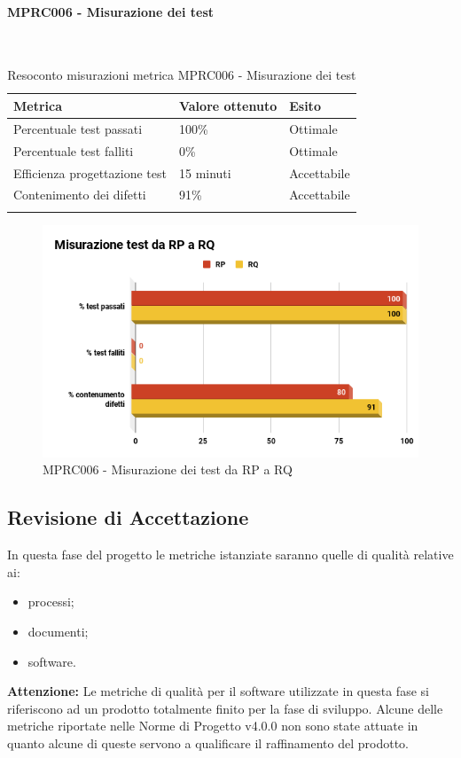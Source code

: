 \paragraph{MPRC006 - Misurazione dei test}\mbox{}\\[0.4cm]
\begin{center}
	\centering
	\renewcommand{\arraystretch}{1.5}
	\begin{longtable}{  p{5cm}  p{5cm} p{3cm}  }
		\rowcolor{tableHeadYellow}
		\textbf{Metrica}   & \textbf{Valore ottenuto} & \textbf{Esito} \\ 
		\endhead
		Percentuale test passati     & 100\%  & Ottimale \\
		Percentuale test falliti     & 0\% & Ottimale \\
		Efficienza progettazione test    & 15 minuti & Accettabile \\
		Contenimento dei difetti    & 91\% & Accettabile \\
		\rowcolor{white}
		\caption{Resoconto misurazioni metrica MPRC006 - Misurazione dei test}
	\end{longtable}
\end{center}
\begin{figure}[H]
	\centering
	\includegraphics[width=13cm,keepaspectratio]{../includes/pics/Misurazione.png}
	\caption{\label{fig:mission}MPRC006 - Misurazione dei test da RP a RQ}
\end{figure}

\subsection{Revisione di Accettazione}
\label{sec:revisione_accettazione}
In questa fase del progetto le metriche istanziate saranno quelle di qualità relative ai:
\begin{itemize}
	\item processi;
	\item documenti;
	\item software.
\end{itemize}
\textbf{Attenzione:} Le metriche di qualità per il software utilizzate in questa fase si riferiscono ad un prodotto totalmente finito per la fase di sviluppo. Alcune delle metriche riportate nelle Norme di Progetto v4.0.0 non sono state attuate in quanto alcune di queste servono a qualificare il raffinamento del prodotto.
